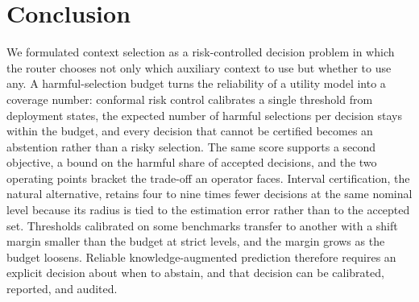 \section{Conclusion}

We formulated context selection as a risk-controlled decision problem in which
the router chooses not only which auxiliary context to use but whether to use
any. A harmful-selection budget turns the reliability of a utility model into
a coverage number: conformal risk control calibrates a single threshold from
deployment states, the expected number of harmful selections per decision
stays within the budget, and every decision that cannot be certified becomes
an abstention rather than a risky selection. The same score supports a second
objective, a bound on the harmful share of accepted decisions, and the two
operating points bracket the trade-off an operator faces. Interval
certification, the natural alternative, retains four to nine times fewer
decisions at the same nominal level because its radius is tied to the
estimation error rather than to the accepted set. Thresholds calibrated on
some benchmarks transfer to another with a shift margin smaller than the
budget at strict levels, and the margin grows as the budget loosens. Reliable
knowledge-augmented prediction therefore requires an explicit decision about
when to abstain, and that decision can be calibrated, reported, and audited.
